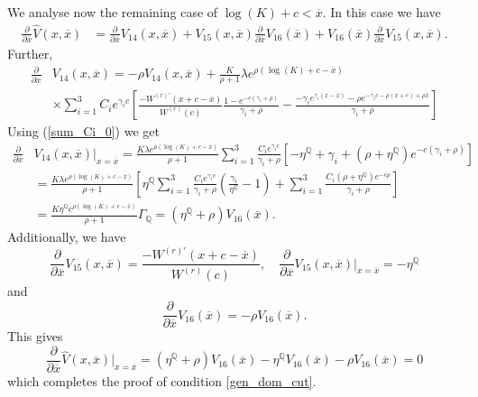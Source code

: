 \documentclass[10pt]{amsart}
\def\Q{{\mathbb{Q}}}
\begin{document}
		We analyse now the remaining case of $\log(K) + c < \overline{x}$.
		In this case we have
		\begin{align*}
			\frac{\partial}{\partial \overline{x}} \hat{V}(x, \overline{x}) &= \frac{\partial}{\partial \overline{x}} V_{14}(x, \overline{x}) +  V_{15}(x, \overline{x}) \frac{\partial}{\partial \overline{x}} V_{16}(\overline{x}) + V_{16}(\overline{x}) \frac{\partial}{\partial \overline{x}}V_{15}(x, \overline{x}).
		\end{align*}		
		Further,
		\begin{align*}
			\frac{\partial}{\partial \overline{x}}& V_{14}(x, \overline{x}) = -\rho V_{14}(x, \overline{x}) +	\frac{K}{\rho+1} \lambda e^{\rho (\log(K)+c - \overline{x})} \\
			&\times \sum_{i=1}^3 C_i e^{\gamma_i c} \left[ \frac{-W^{(r)'}(x+c-\overline{x})}{W^{(r)}(c)}\frac{1 - e^{-c(\gamma_i+\rho)}}{\gamma_i + \rho} - \frac{-\gamma_i e^{\gamma_i(x - \overline{x})} - \rho e^{-\gamma_i c - \rho(x+c) + \rho\overline{x}}}{\gamma_i + \rho} \right]
		\end{align*}
		Using (\ref{sum_Ci_0}) we get
		\begin{align*}
			\frac{\partial}{\partial \overline{x}}& V_{14}(x, \overline{x})\big|_{x = \overline{x}} = \frac{K \lambda e^{\rho (\log(K)+c - \overline{x})}}{\rho+1}\sum_{i=1}^3 \frac{C_i e^{\gamma_i c}}{\gamma_i + \rho}\left[- \eta^\Q + \gamma_i +  (\rho + \eta^\Q)e^{-c(\gamma_i + \rho)} \right]
			\\
			& = \frac{K \lambda e^{\rho (\log(K)+c - \overline{x})}}{\rho+1} \left[ \eta^\Q\sum_{i=1}^3 \frac{C_i e^{\gamma_i c}}{\gamma_i + \rho}\left( \frac{\gamma_i}{\eta^\Q} - 1 \right) + \sum_{i=1}^3 \frac{C_i(\rho + \eta^\Q)e^{-c\rho}}{\gamma_i + \rho} \right]
			\\
			& = \frac{K\eta^\Q e^{\rho (\log(K)+c - \overline{x})}}{\rho + 1}\Gamma_\Q = (\eta^\Q + \rho) V_{16}(\overline{x}).
		\end{align*}
		Additionally, we have
		\begin{equation*}
			\frac{\partial}{\partial \overline{x}}V_{15}(x, \overline{x}) = \frac{-W^{(r)'}(x + c - \overline{x})}{W^{(r)}(c)}, \quad \frac{\partial}{\partial \overline{x}}V_{15}(x, \overline{x})\big|_{x = \overline{x}} = -\eta^\Q
		\end{equation*}		
		and
		\begin{equation*}
			\frac{\partial}{\partial \overline{x}}V_{16}(\overline{x}) = -\rho V_{16}(\overline{x}).
		\end{equation*}
		This gives		
		\begin{equation*}
			\frac{\partial}{\partial \overline{x}} \hat{V}(x, \overline{x})\big|_{x = \overline{x}} = (\eta^\Q + \rho) V_{16}(\overline{x}) - \eta^\Q V_{16}(\overline{x}) -\rho V_{16}(\overline{x}) = 0
		\end{equation*}	
		which completes the proof of condition \eqref{gen_dom_cut}.
		
\end{document}
